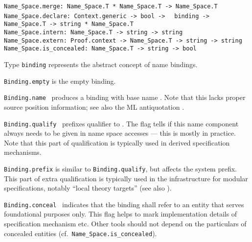 \begin{isabellebody}
\begin{isamarkuptext}
\begin{mldecls}
  \verb|Name_Space.merge: Name_Space.T * Name_Space.T -> Name_Space.T| \\
  \verb|Name_Space.declare: Context.generic -> bool ->|\isasep\isanewline%
\verb|  binding -> Name_Space.T -> string * Name_Space.T| \\
  \verb|Name_Space.intern: Name_Space.T -> string -> string| \\
  \verb|Name_Space.extern: Proof.context -> Name_Space.T -> string -> string| \\
  \verb|Name_Space.is_concealed: Name_Space.T -> string -> bool|
  \end{mldecls}

  \begin{description}

  \item Type \verb|binding| represents the abstract concept of
  name bindings.

  \item \verb|Binding.empty| is the empty binding.

  \item \verb|Binding.name|~ produces a binding with base
  name .  Note that this lacks proper source position
  information; see also the ML antiquotation \hyperlink{ML antiquotation.binding}{\mbox{}}.

  \item \verb|Binding.qualify|~
  prefixes qualifier  to .  The  flag tells if this name component always needs to be
  given in name space accesses --- this is mostly  in
  practice.  Note that this part of qualification is typically used in
  derived specification mechanisms.

  \item \verb|Binding.prefix| is similar to \verb|Binding.qualify|, but
  affects the system prefix.  This part of extra qualification is
  typically used in the infrastructure for modular specifications,
  notably ``local theory targets'' (see also ).

  \item \verb|Binding.conceal|~ indicates that the
  binding shall refer to an entity that serves foundational purposes
  only.  This flag helps to mark implementation details of
  specification mechanism etc.  Other tools should not depend on the
  particulars of concealed entities (cf.\ \verb|Name_Space.is_concealed|).


\end{description}
\end{isamarkuptext}
\end{isabellebody}
